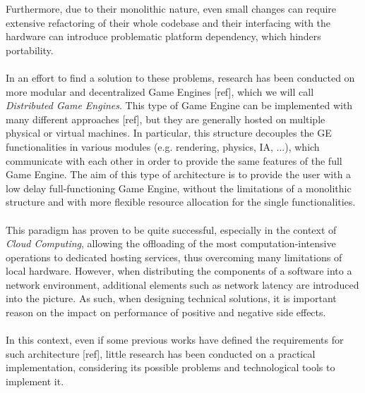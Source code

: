 Furthermore, due to their monolithic nature, even small changes can require extensive refactoring of their whole codebase and their interfacing with the hardware can introduce problematic platform dependency, which hinders portability. \\ \\
In an effort to find a solution to these problems, research has been conducted on more modular and decentralized Game Engines [ref], which we will call \textit{Distributed Game Engines}. This type of Game Engine can be implemented with many different approaches [ref], but they are generally hosted on multiple physical or virtual machines. In particular, this structure decouples the GE functionalities in various modules (e.g. rendering, physics, IA, ...), which communicate with each other in order to provide the same features of the full Game Engine. The aim of this type of architecture is to provide the user with a low delay full-functioning Game Engine, without the limitations of a monolithic structure and with more flexible resource allocation for the single functionalities. \\ \\
This paradigm has proven to be quite successful, especially in the context of \textit{Cloud Computing}, allowing the offloading of the most computation-intensive operations to dedicated hosting services, thus overcoming many limitations of local hardware. However, when distributing the components of a software into a network environment, additional elements such as network latency are introduced into the picture. As such, when designing technical solutions, it is important reason on the impact on performance of positive and negative side effects. \\ \\
In this context, even if some previous works have defined the requirements for such architecture [ref], little research has been conducted on a practical implementation, considering its possible problems and technological tools to implement it.

